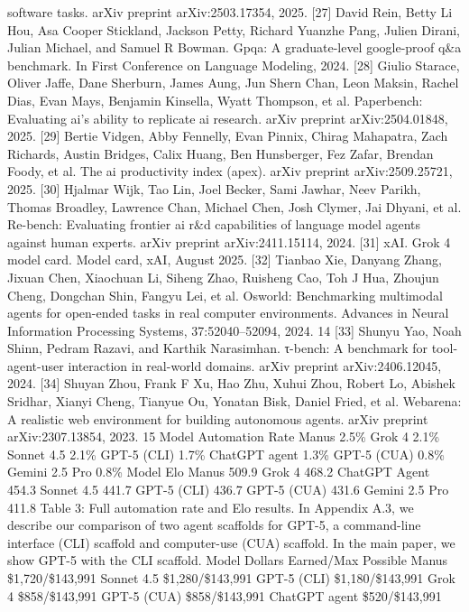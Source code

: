 software tasks. arXiv preprint arXiv:2503.17354, 2025.
[27] David Rein, Betty Li Hou, Asa Cooper Stickland, Jackson Petty, Richard Yuanzhe Pang, Julien
Dirani, Julian Michael, and Samuel R Bowman. Gpqa: A graduate-level google-proof q\&a
benchmark. In First Conference on Language Modeling, 2024.
[28] Giulio Starace, Oliver Jaffe, Dane Sherburn, James Aung, Jun Shern Chan, Leon Maksin,
Rachel Dias, Evan Mays, Benjamin Kinsella, Wyatt Thompson, et al. Paperbench: Evaluating
ai’s ability to replicate ai research. arXiv preprint arXiv:2504.01848, 2025.
[29] Bertie Vidgen, Abby Fennelly, Evan Pinnix, Chirag Mahapatra, Zach Richards, Austin Bridges,
Calix Huang, Ben Hunsberger, Fez Zafar, Brendan Foody, et al. The ai productivity index
(apex). arXiv preprint arXiv:2509.25721, 2025.
[30] Hjalmar Wijk, Tao Lin, Joel Becker, Sami Jawhar, Neev Parikh, Thomas Broadley, Lawrence
Chan, Michael Chen, Josh Clymer, Jai Dhyani, et al. Re-bench: Evaluating frontier ai r\&d
capabilities of language model agents against human experts. arXiv preprint arXiv:2411.15114,
2024.
[31] xAI. Grok 4 model card. Model card, xAI, August 2025.
[32] Tianbao Xie, Danyang Zhang, Jixuan Chen, Xiaochuan Li, Siheng Zhao, Ruisheng Cao, Toh J
Hua, Zhoujun Cheng, Dongchan Shin, Fangyu Lei, et al. Osworld: Benchmarking multimodal
agents for open-ended tasks in real computer environments. Advances in Neural Information
Processing Systems, 37:52040–52094, 2024.
14
[33] Shunyu Yao, Noah Shinn, Pedram Razavi, and Karthik Narasimhan. τ-bench: A benchmark for
tool-agent-user interaction in real-world domains. arXiv preprint arXiv:2406.12045, 2024.
[34] Shuyan Zhou, Frank F Xu, Hao Zhu, Xuhui Zhou, Robert Lo, Abishek Sridhar, Xianyi Cheng,
Tianyue Ou, Yonatan Bisk, Daniel Fried, et al. Webarena: A realistic web environment for
building autonomous agents. arXiv preprint arXiv:2307.13854, 2023.
15
Model
Automation Rate
Manus
2.5\%
Grok 4
2.1\%
Sonnet 4.5
2.1\%
GPT-5 (CLI)
1.7\%
ChatGPT agent
1.3\%
GPT-5 (CUA)
0.8\%
Gemini 2.5 Pro
0.8\%
Model
Elo
Manus
509.9
Grok 4
468.2
ChatGPT Agent
454.3
Sonnet 4.5
441.7
GPT-5 (CLI)
436.7
GPT-5 (CUA)
431.6
Gemini 2.5 Pro
411.8
Table 3: Full automation rate and Elo results. In Appendix A.3, we describe our comparison of
two agent scaffolds for GPT-5, a command-line interface (CLI) scaffold and computer-use (CUA)
scaffold. In the main paper, we show GPT-5 with the CLI scaffold.
Model
Dollars Earned/Max Possible
Manus
\$1,720/\$143,991
Sonnet 4.5
\$1,280/\$143,991
GPT-5 (CLI)
\$1,180/\$143,991
Grok 4
\$858/\$143,991
GPT-5 (CUA)
\$858/\$143,991
ChatGPT agent
\$520/\$143,991
